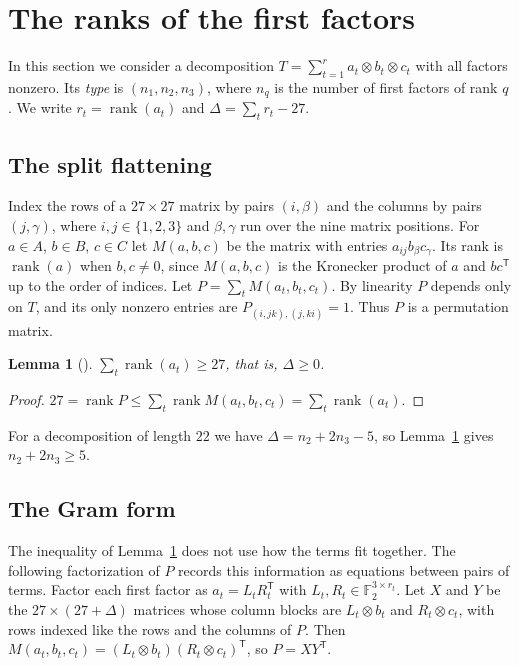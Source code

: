 \documentclass[11pt]{amsart}
\newtheorem{lemma}[theorem]{Lemma}
\theoremstyle{definition}
\theoremstyle{remark}
\numberwithin{equation}{section}
\newcommand{\F}{\mathbb{F}_2}
\newcommand{\rk}{\operatorname{rank}}
\begin{document}
\section{The ranks of the first factors}\label{sec:types}

In this section we consider a decomposition $T=\sum_{t=1}^{r}a_t\otimes b_t\otimes c_t$ with all factors nonzero. Its \emph{type} is $(n_1,n_2,n_3)$, where $n_q$ is the number of first factors of rank $q$. We write $r_t=\rk(a_t)$ and $\Delta=\sum_t r_t-27$.

\subsection{The split flattening}
Index the rows of a $27\times 27$ matrix by pairs $(i,\beta)$ and the columns by pairs $(j,\gamma)$, where $i,j\in\{1,2,3\}$ and $\beta,\gamma$ run over the nine matrix positions. For $a\in A$, $b\in B$, $c\in C$ let $M(a,b,c)$ be the matrix with entries $a_{ij}b_\beta c_\gamma$. Its rank is $\rk(a)$ when $b,c\ne 0$, since $M(a,b,c)$ is the Kronecker product of $a$ and $bc^{\mathsf T}$ up to the order of indices. Let $P=\sum_t M(a_t,b_t,c_t)$. By linearity $P$ depends only on $T$, and its only nonzero entries are $P_{(i,jk),(j,ki)}=1$. Thus $P$ is a permutation matrix.

\begin{lemma}[{\cite[(4.2)]{Yan26}}]\label{lem:split}
$\sum_t\rk(a_t)\ge 27$, that is, $\Delta\ge 0$.
\end{lemma}

\begin{proof}
$27=\rk P\le\sum_t\rk M(a_t,b_t,c_t)=\sum_t\rk(a_t)$.
\end{proof}

For a decomposition of length $22$ we have $\Delta=n_2+2n_3-5$, so Lemma~\ref{lem:split} gives $n_2+2n_3\ge 5$.

\subsection{The Gram form}
The inequality of Lemma~\ref{lem:split} does not use how the terms fit together. The following factorization of $P$ records this information as equations between pairs of terms. Factor each first factor as $a_t=L_tR_t^{\mathsf T}$ with $L_t,R_t\in\F^{3\times r_t}$. Let $X$ and $Y$ be the $27\times(27+\Delta)$ matrices whose column blocks are $L_t\otimes b_t$ and $R_t\otimes c_t$, with rows indexed like the rows and the columns of $P$. Then $M(a_t,b_t,c_t)=(L_t\otimes b_t)(R_t\otimes c_t)^{\mathsf T}$, so $P=XY^{\mathsf T}$.
\end{document}
